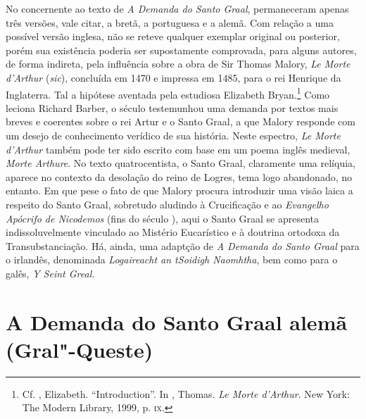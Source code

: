 No concernente ao texto de \textit{A Demanda do Santo Graal}, permaneceram
apenas três versões, vale citar, a bretã, a portuguesa e a alemã. Com relação a
uma possível versão inglesa, não se reteve qualquer exemplar original ou
posterior, porém sua existência poderia ser supostamente comprovada, para alguns
autores, de forma indireta, pela influência sobre a obra de Sir Thomas Malory,
\textit{Le Morte d’Arthur} (\textit{sic}), concluída em 1470 e impressa em 1485,
para o rei Henrique  da Inglaterra. Tal a hipótese aventada pela
estudiosa Elizabeth Bryan.\footnote{ Cf. , Elizabeth. ``Introduction''. In
, Thomas. \textit{Le Morte d'Arthur}. New York: The Modern Library, 1999,
p. \textsc{ix}. } Como leciona Richard Barber, o século  testemunhou
uma demanda por textos mais breves e coerentes sobre o rei Artur e o Santo
Graal, a que Malory responde com um desejo de conhecimento verídico de sua história.
Neste espectro, \textit{Le Morte d’Arthur} também pode ter sido
escrito com base em um poema inglês medieval, \textit{Morte Arthure}. No texto
quatrocentista, o Santo Graal, claramente uma relíquia, aparece no contexto da
desolação do reino de Logres, tema logo abandonado, no entanto. Em que pese o
fato de que Malory procura introduzir uma visão laica a respeito do Santo Graal,
sobretudo aludindo à Crucificação e ao \textit{Evangelho Apócrifo de Nicodemos}
(fins do século ), aqui o Santo Graal se apresenta indissoluvelmente
vinculado ao Mistério Eucarístico e à doutrina ortodoxa da Transubstanciação.
Há, ainda, uma adaptção de \textit{A Demanda do Santo Graal}  para o irlandês,
denominada \textit{Logaireacht an tSoidigh Naomhtha}, bem como para o galês,
\textit{Y Seint Greal.}

\section{A Demanda do Santo Graal alemã (Gral"-Queste)}

